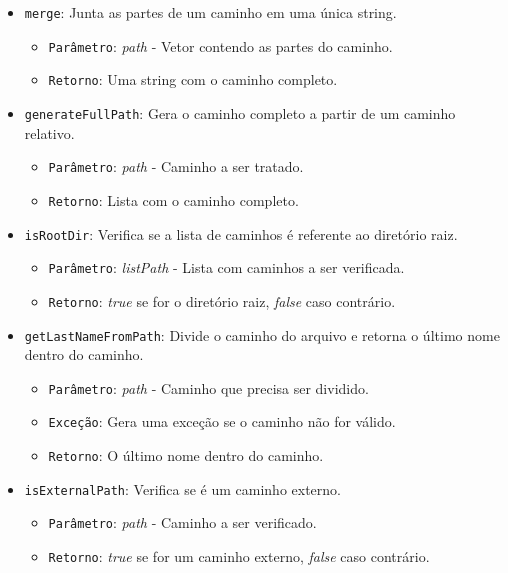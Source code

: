 \documentclass[
    12pt,				%
    oneside,   	        %
    a4paper,			%
    english,			%
    french,				%
    spanish,			%
    brazil,				%
    ]{pacotes/abntex2}
\begin{document}
\begin{itemize}
\begin{itemize}
            \item \texttt{merge}: Junta as partes de um caminho em uma única string.
            \begin{itemize}
                \item \texttt{Parâmetro}: \textit{path} - Vetor contendo as partes do caminho.
                \item \texttt{Retorno}: Uma string com o caminho completo.
            \end{itemize}
            \item \texttt{generateFullPath}: Gera o caminho completo a partir de um caminho relativo.
            \begin{itemize}
                \item \texttt{Parâmetro}: \textit{path} - Caminho a ser tratado.
                \item \texttt{Retorno}: Lista com o caminho completo.
            \end{itemize}
            \item \texttt{isRootDir}: Verifica se a lista de caminhos é referente ao diretório raiz.
            \begin{itemize}
                \item \texttt{Parâmetro}: \textit{listPath} - Lista com caminhos a ser verificada.
                \item \texttt{Retorno}: \textit{true} se for o diretório raiz, \textit{false} caso contrário.
            \end{itemize}
            \item \texttt{getLastNameFromPath}: Divide o caminho do arquivo e retorna o último nome dentro do caminho.
            \begin{itemize}
                \item \texttt{Parâmetro}: \textit{path} - Caminho que precisa ser dividido.
                \item \texttt{Exceção}: Gera uma exceção se o caminho não for válido.
                \item \texttt{Retorno}: O último nome dentro do caminho.
        \end{itemize}
            \item \texttt{isExternalPath}: Verifica se é um caminho externo.
            \begin{itemize}
                \item \texttt{Parâmetro}: \textit{path} - Caminho a ser verificado.
                \item \texttt{Retorno}: \textit{true} se for um caminho externo, \textit{false} caso contrário.
            \end{itemize}
        \end{itemize}
\end{itemize}
\end{document}
